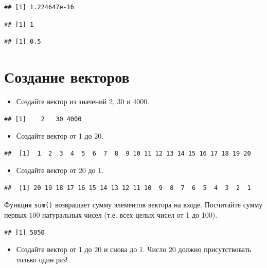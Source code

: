 \documentclass[]{book}
\providecommand{\tightlist}{%
  \setlength{\itemsep}{0pt}\setlength{\parskip}{0pt}}
\begin{document}
\begin{verbatim}
## [1] 1.224647e-16
\end{verbatim}

\begin{verbatim}
## [1] 1
\end{verbatim}

\begin{verbatim}
## [1] 0.5
\end{verbatim}

\section{Создание векторов}\label{task_new_vecs}

\begin{itemize}
\tightlist
\item
  Создайте вектор из значений 2, 30 и 4000.
\end{itemize}

\begin{verbatim}
## [1]    2   30 4000
\end{verbatim}

\begin{itemize}
\tightlist
\item
  Создайте вектор от 1 до 20.
\end{itemize}

\begin{verbatim}
##  [1]  1  2  3  4  5  6  7  8  9 10 11 12 13 14 15 16 17 18 19 20
\end{verbatim}

\begin{itemize}
\tightlist
\item
  Создайте вектор от 20 до 1.
\end{itemize}

\begin{verbatim}
##  [1] 20 19 18 17 16 15 14 13 12 11 10  9  8  7  6  5  4  3  2  1
\end{verbatim}

Функция \texttt{sum()} возвращает сумму элементов вектора на входе.
Посчитайте сумму первых 100 натуральных чисел (т.е. всех целых чисел от
1 до 100).

\begin{verbatim}
## [1] 5050
\end{verbatim}

\begin{itemize}
\tightlist
\item
  Создайте вектор от 1 до 20 и снова до 1. Число 20 должно
  присутствовать только один раз!
\end{itemize}
\end{document}

